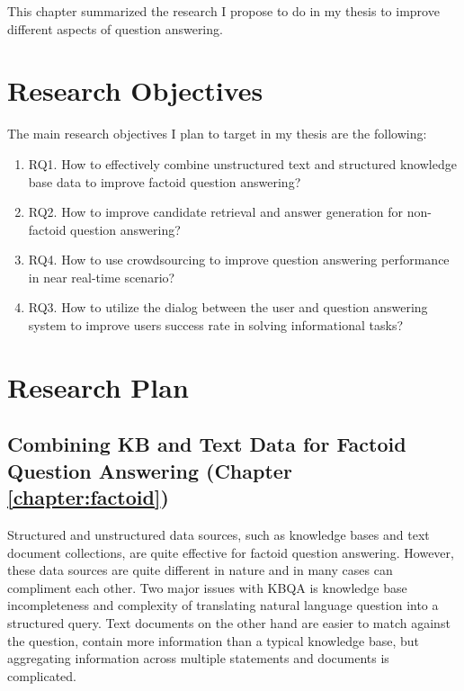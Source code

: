 %

\label{chapter:proposal}

\noindent

This chapter summarized the research I propose to do in my thesis to improve different aspects of question answering.

\section{Research Objectives}
\label{section:proposal:objectives}

The main research objectives I plan to target in my thesis are the following:

\begin{enumerate}
\item RQ1. How to effectively combine unstructured text and structured knowledge base data to improve factoid question answering?
\item RQ2. How to improve candidate retrieval and answer generation for non-factoid question answering?
\item RQ4. How to use crowdsourcing to improve question answering performance in near real-time scenario?
\item RQ3. How to utilize the dialog between the user and question answering system to improve users success rate in solving informational tasks?
\end{enumerate}

\section{Research Plan}
\label{section:proposal:plan}

\subsection{Combining KB and Text Data for Factoid Question Answering (Chapter \ref{chapter:factoid})}
\label{section:proposal:plan:factoid}

Structured and unstructured data sources, such as knowledge bases and text document collections, are quite effective for factoid question answering.
However, these data sources are quite different in nature and in many cases can compliment each other.
Two major issues with KBQA is knowledge base incompleteness and complexity of translating natural language question into a structured query.
Text documents on the other hand are easier to match against the question, contain more information than a typical knowledge base, but aggregating information across multiple statements and documents is complicated.

